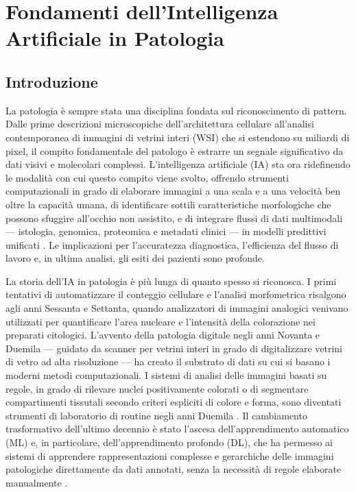 
\chapter{Fondamenti dell'Intelligenza Artificiale in Patologia}
\label{ch:3}

\section{Introduzione}
\label{sec:ch3_intro}

La patologia è sempre stata una disciplina fondata sul riconoscimento di pattern. Dalle prime descrizioni microscopiche dell'architettura cellulare all'analisi contemporanea di immagini di vetrini interi (WSI) che si estendono su miliardi di pixel, il compito fondamentale del patologo è estrarre un segnale significativo da dati visivi e molecolari complessi. L'intelligenza artificiale (IA) sta ora ridefinendo le modalità con cui questo compito viene svolto, offrendo strumenti computazionali in grado di elaborare immagini a una scala e a una velocità ben oltre la capacità umana, di identificare sottili caratteristiche morfologiche che possono sfuggire all'occhio non assistito, e di integrare flussi di dati multimodali — istologia, genomica, proteomica e metadati clinici — in modelli predittivi unificati \cite{bera2019}. Le implicazioni per l'accuratezza diagnostica, l'efficienza del flusso di lavoro e, in ultima analisi, gli esiti dei pazienti sono profonde.

La storia dell'IA in patologia è più lunga di quanto spesso si riconosca. I primi tentativi di automatizzare il conteggio cellulare e l'analisi morfometrica risalgono agli anni Sessanta e Settanta, quando analizzatori di immagini analogici venivano utilizzati per quantificare l'area nucleare e l'intensità della colorazione nei preparati citologici. L'avvento della patologia digitale negli anni Novanta e Duemila — guidato da scanner per vetrini interi in grado di digitalizzare vetrini di vetro ad alta risoluzione — ha creato il substrato di dati su cui si basano i moderni metodi computazionali. I sistemi di analisi delle immagini basati su regole, in grado di rilevare nuclei positivamente colorati o di segmentare compartimenti tissutali secondo criteri espliciti di colore e forma, sono diventati strumenti di laboratorio di routine negli anni Duemila \cite{bankhead2017}. Il cambiamento trasformativo dell'ultimo decennio è stato l'ascesa dell'apprendimento automatico (ML) e, in particolare, dell'apprendimento profondo (DL), che ha permesso ai sistemi di apprendere rappresentazioni complesse e gerarchiche delle immagini patologiche direttamente da dati annotati, senza la necessità di regole elaborate manualmente \cite{komura2018}.


